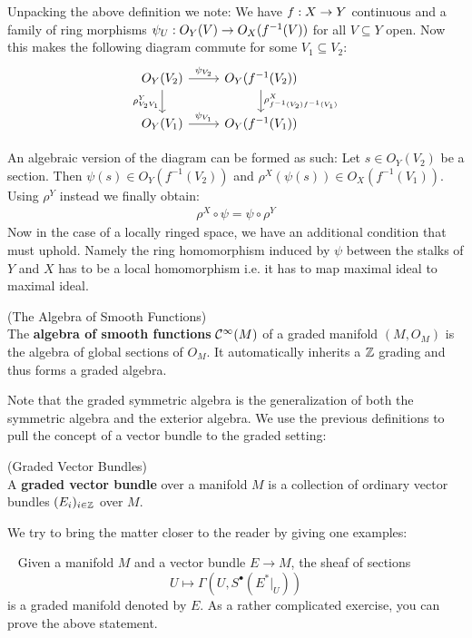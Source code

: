 Unpacking the above definition we note: We have $f:X \rightarrow Y$ continuous and a family of ring morphisms $\psi_U: O_Y(V) \rightarrow O_X(f^{-1}(V))$ for all $V\subseteq Y$ open. Now this makes the following diagram commute for some $V_1 \subseteq V_2$:
\[
\begin{tikzcd}
  O_Y(V_2) \arrow{r}{\psi_{V_2}} \arrow[swap]{d}{\rho^Y_{V_2 V_1}} & O_Y(f^{-1}(V_2)) \arrow{d}{\rho^X_{f^{-1}(V_2) f^{-1}(V_1)}} \\
  O_Y(V_1) \arrow{r}{\psi_{V_1}} & O_Y(f^{-1}(V_1))
\end{tikzcd}
\]

An algebraic version of the diagram can be formed as such: Let $s\in O_Y(V_2)$ be a section. Then $\psi(s) \in O_Y(f^{-1}(V_2))$ and $\rho^X(\psi(s)) \in O_X(f^{-1}(V_1))$. Using $\rho^Y$ instead we finally obtain:
\begin{align}
  \rho^X \circ \psi = \psi \circ \rho^Y
\end{align}
Now in the case of a locally ringed space, we have an additional condition that must uphold. Namely the ring homomorphism induced by $\psi$ between the stalks of $Y$ and $X$ has to be a local homomorphism i.e. it has to map maximal ideal to maximal ideal.

\begin{definition} (The Algebra of Smooth Functions)\\
  The \textbf{algebra of smooth functions} $\mathcal{C}^{\infty}(M)$ of a graded manifold $(M, O_M)$ is the algebra of global sections of $O_M$. It automatically inherits a $\mathbb{Z}$ grading and thus forms a graded algebra.
\end{definition}

Note that the graded symmetric algebra is the generalization of both the symmetric algebra and the exterior algebra. We use the previous definitions to pull the concept of a vector bundle to the graded setting:

\begin{definition} (Graded Vector Bundles)\\
  A \textbf{graded vector bundle} over a manifold $M$ is a collection of ordinary vector bundles $(E_i)_{i\in \mathbb{Z}}$ over $M$.
\end{definition}

We try to bring the matter closer to the reader by giving one examples:

\begin{example}~
\label{Sheaf_of_sections}
  Given a manifold $M$ and a vector bundle $E\longrightarrow M$, the sheaf of sections
  $$ U \mapsto \Gamma(U, S^\bullet(E^*|_U)) $$
  is a graded manifold denoted by $E$. As a rather complicated exercise, you can prove the above statement.
\end{example}

